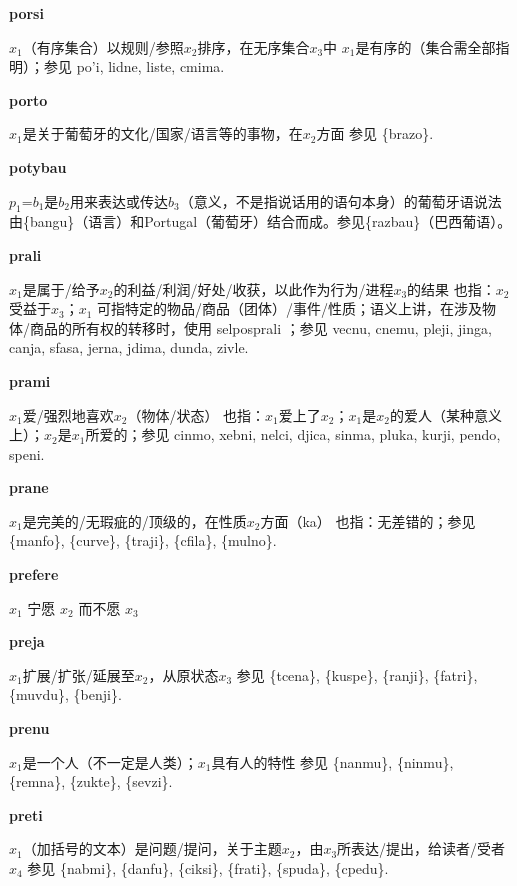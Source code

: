 \documentclass[notitlepage,twocolumn,a4paper,10pt]{book}
\begin{document}
{\sffamily\bfseries porsi}  $x_1$（有序集合）以规则\slash{}参照$x_2$排序，在无序集合$x_3$中 \textemdash{} $x_1$是有序的（集合需全部指明）；参见 {po'i}, {lidne}, {liste}, {cmima}.

{\sffamily\bfseries porto}\enspace {\ttfamily\bfseries[pot]}  $x_1$是关于葡萄牙的文化\slash{}国家\slash{}语言等的事物，在$x_2$方面 \textemdash{} 参见 \{brazo\}.

{\sffamily\bfseries potybau} $p_1$=$b_1$是$b_2$用来表达或传达$b_3$（意义，不是指说话用的语句本身）的葡萄牙语说法 \textemdash{} 由\{bangu\}（语言）和Portugal（葡萄牙）结合而成。参见\{razbau\}（巴西葡语）。

{\sffamily\bfseries prali}\enspace {\ttfamily\bfseries[pal]}  $x_1$是属于\slash{}给予$x_2$的利益\slash{}利润\slash{}好处\slash{}收获，以此作为行为\slash{}进程$x_3$的结果 \textemdash{} 也指：$x_2$受益于$x_3$；$x_1$ 可指特定的物品\slash{}商品（团体）\slash{}事件\slash{}性质；语义上讲，在涉及物体\slash{}商品的所有权的转移时，使用 {selposprali} ；参见 {vecnu}, {cnemu}, {pleji}, {jinga}, {canja}, {sfasa}, {jerna}, {jdima}, {dunda}, {zivle}.

{\sffamily\bfseries prami}\enspace {\ttfamily\bfseries[pam     pa'i]}  $x_1$爱\slash{}强烈地喜欢$x_2$（物体\slash{}状态） \textemdash{} 也指：$x_1$爱上了$x_2$；$x_1$是$x_2$的爱人（某种意义上）；$x_2$是$x_1$所爱的；参见 {cinmo}, {xebni}, {nelci}, {djica}, {sinma}, {pluka}, {kurji}, {pendo}, {speni}.

{\sffamily\bfseries prane}\enspace {\ttfamily\bfseries[        pa'e]}  $x_1$是完美的\slash{}无瑕疵的\slash{}顶级的，在性质$x_2$方面（ka） \textemdash{} 也指：无差错的；参见 \{manfo\}, \{curve\}, \{traji\}, \{cfila\}, \{mulno\}.

{\sffamily\bfseries prefere} $x_1$ 宁愿 $x_2$ 而不愿 $x_3$

{\sffamily\bfseries preja}\enspace {\ttfamily\bfseries[pej     pe'a]}  $x_1$扩展\slash{}扩张\slash{}延展至$x_2$，从原状态$x_3$ \textemdash{} 参见 \{tcena\}, \{kuspe\}, \{ranji\}, \{fatri\}, \{muvdu\}, \{benji\}.

{\sffamily\bfseries prenu}\enspace {\ttfamily\bfseries[    pre]}  $x_1$是一个人（不一定是人类）；$x_1$具有人的特性 \textemdash{} 参见 \{nanmu\}, \{ninmu\}, \{remna\}, \{zukte\}, \{sevzi\}.

{\sffamily\bfseries preti}  $x_1$（加括号的文本）是问题\slash{}提问，关于主题$x_2$，由$x_3$所表达\slash{}提出，给读者\slash{}受者$x_4$ \textemdash{} 参见 \{nabmi\}, \{danfu\}, \{ciksi\}, \{frati\}, \{spuda\}, \{cpedu\}.
\end{document}

